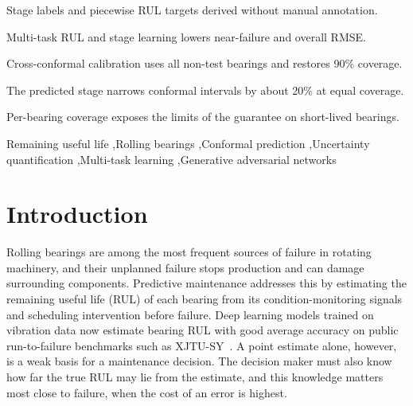 \documentclass[review]{elsarticle}
\begin{document}
\begin{frontmatter}
\begin{highlights}
\item Stage labels and piecewise RUL targets derived without manual annotation.
\item Multi-task RUL and stage learning lowers near-failure and overall RMSE.
\item Cross-conformal calibration uses all non-test bearings and restores 90\% coverage.
\item The predicted stage narrows conformal intervals by about 20\% at equal coverage.
\item Per-bearing coverage exposes the limits of the guarantee on short-lived bearings.
\end{highlights}

\begin{keyword}
Remaining useful life \sep Rolling bearings \sep Conformal prediction
\sep Uncertainty quantification \sep Multi-task learning
\sep Generative adversarial networks
\end{keyword}

\end{frontmatter}

\section{Introduction}
\label{sec:introduction}

Rolling bearings are among the most frequent sources of failure in
rotating machinery, and their unplanned failure stops production and
can damage surrounding components. Predictive maintenance addresses
this by estimating the remaining useful life (RUL) of each bearing from
its condition-monitoring signals and scheduling intervention before
failure. Deep learning models trained on vibration data now estimate
bearing RUL with good average accuracy on public run-to-failure
benchmarks such as XJTU-SY~\cite{8576668, lei2019xjtusy}. A point
estimate alone, however, is a weak basis for a maintenance decision.
The decision maker must also know how far the true RUL may lie from the
estimate, and this knowledge matters most close to failure, when the
cost of an error is highest.\\
\end{document}
